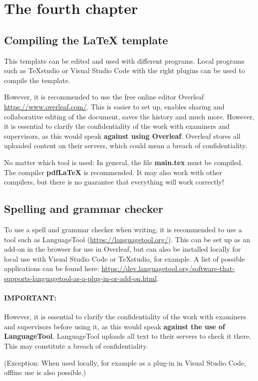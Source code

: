 \chapter{The fourth chapter}

\section{Compiling the LaTeX template}
This template can be edited and used with different programs. Local programs such as TeXstudio or Visual Studio Code with the right plugins can be used to compile the template.

However, it is recommended to use the free online editor Overleaf \href{https://www.overleaf.com/}{https://www.overleaf.com/}. This is easier to set up, enables sharing and collaborative editing of the document, saves the history and much more. However, it is essential to clarify the confidentiality of the work with examiners and supervisors, as this would speak \textbf{against using Overleaf}. Overleaf stores all uploaded content on their servers, which could mean a breach of confidentiality.

No matter which tool is used: In general, the file \textbf{main.tex} must be compiled. The compiler \textbf{pdfLaTeX} is recommended. It may also work with other compilers, but there is no guarantee that everything will work correctly!


\section{Spelling and grammar checker}
To use a spell and grammar checker when writing, it is recommended to use a tool such as LanguageTool (\href{https://languagetool.org/}{https://languagetool.org/}). This can be set up as an add-on in the browser for use in Overleaf, but can also be installed locally for local use with Visual Studio Code or TeXstudio, for example. A list of possible applications can be found here: \href{https://dev.languagetool.org/software-that-supports-languagetool-as-a-plug-in-or-add-on.html}{https://dev.languagetool.org/software-that-supports-languagetool-as-a-plug-in-or-add-on.html}.

\subsubsection{IMPORTANT:}
However, it is essential to clarify the confidentiality of the work with examiners and supervisors before using it, as this would speak \textbf{against the use of LanguageTool}. LanguageTool uploads all text to their servers to check it there. This may constitute a breach of confidentiality.

(Exception: When used locally, for example as a plug-in in Visual Studio Code, offline use is also possible.)